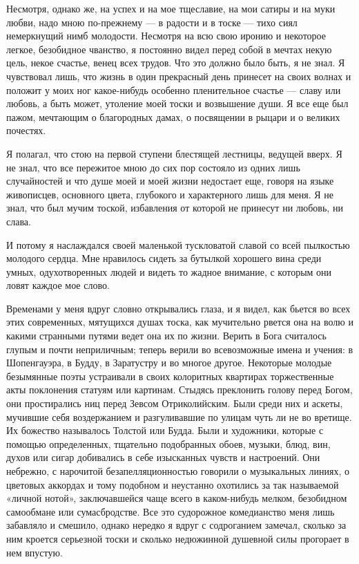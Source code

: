 Несмотря, однако же, на  успех и на мое тщеславие, на  мои сатиры и на
муки любви,  надо мною по-прежнему  --- в радости  и в тоске  --- тихо
сиял  немеркнущий  нимб  молодости.  Несмотря на  всю  свою  иронию  и
некоторое легкое, безобидное чванство, я постоянно видел перед собой в
мечтах некую  цель, некое счастье,  венец всех трудов. Что  это должно
было быть, я  не знал. Я чувствовал лишь, что  жизнь в один прекрасный
день  принесет на  своих  волнах  и положит  у  моих ног  какое-нибудь
особенно  пленительное счастье  --- славу  или любовь,  а быть  может,
утоление моей тоски и возвышение души.  Я все еще был пажом, мечтающим
о благородных дамах, о посвящении в рыцари и о великих почестях.

Я  полагал, что  стою на  первой ступени  блестящей лестницы,  ведущей
вверх. Я не знал, что все пережитое  мною до сих пор состояло из одних
лишь случайностей и  что душе моей и моей жизни  недостает еще, говоря
на языке  живописцев, основного  цвета, глубокого и  характерного лишь
для меня.  Я не знал, что  был мучим тоской, избавления  от которой не
принесут ни любовь, ни слава.

И  потому я  наслаждался своей  маленькой тускловатой  славой со  всей
пылкостью молодого  сердца. Мне нравилось сидеть  за бутылкой хорошего
вина среди умных, одухотворенных людей  и видеть то жадное внимание, с
которым они ловят каждое мое слово.

Временами у меня вдруг словно открывались глаза, и я видел, как бьется
во всех этих современных, мятущихся душах тоска, как мучительно рвется
она на  волю и какими странными  путями ведет она их  по жизни. Верить
в  Бога  считалось  глупым  и  почти  неприличным;  теперь  верили  во
всевозможные имена  и учения: в  Шопенгауэра, в Будду, в  Заратустру и
во  многое другое.  Некоторые  молодые безымянные  поэты устраивали  в
своих колоритных  квартирах торжественные акты поклонения  статуям или
картинам. Стыдясь преклонить голову  перед Богом, они простирались ниц
перед Зевсом  Отриколийским. Были  среди них  и аскеты,  мучившие себя
воздержанием  и разгуливавшие  по улицам  чуть  ли не  во вретище.  Их
божество называлось  Толстой или  Будда. Были  и художники,  которые с
помощью определенных, тщательно подобранных  обоев, музыки, блюд, вин,
духов или сигар добивались в  себе изысканных чувств и настроений. Они
небрежно,  с  нарочитой  безапелляционностью  говорили  о  музыкальных
линиях, о цветовых  аккордах и тому подобном и  неустанно охотились за
так называемой «личной нотой», заключавшейся чаще всего в каком-нибудь
мелком, безобидном  самообмане или  сумасбродстве. Все  это судорожное
комедианство меня лишь  забавляло и смешило, однако нередко  я вдруг с
содроганием замечал, сколько за ним  кроется серьезной тоски и сколько
недюжинной душевной силы прогорает в нем впустую.

